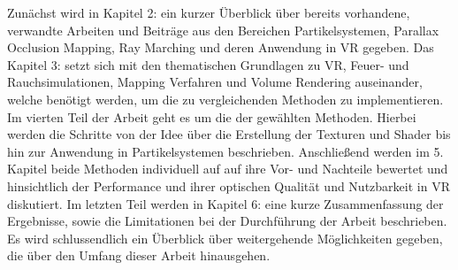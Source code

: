 Zunächst wird in Kapitel 2: \textbf{} ein kurzer Überblick über bereits vorhandene, verwandte Arbeiten
und Beiträge aus den Bereichen Partikelsystemen, Parallax Occlusion Mapping, Ray Marching und deren Anwendung in VR gegeben.
Das Kapitel 3: \textbf{} setzt sich mit den thematischen Grundlagen zu VR, Feuer- und Rauchsimulationen,
Mapping Verfahren und Volume Rendering auseinander, welche benötigt werden, um die zu vergleichenden Methoden zu implementieren.
Im vierten Teil der Arbeit geht es um die \textbf{} der gewählten Methoden. Hierbei werden die Schritte 
von der Idee über die Erstellung der Texturen und Shader bis hin zur Anwendung in Partikelsystemen beschrieben.
Anschließend werden im 5. Kapitel \textbf{} beide  Methoden individuell auf auf ihre Vor- und Nachteile bewertet und 
hinsichtlich der Performance und ihrer optischen Qualität und Nutzbarkeit in VR diskutiert. 
Im letzten Teil werden in Kapitel 6: \textbf{} eine kurze Zusammenfassung der Ergebnisse, sowie die Limitationen bei der 
Durchführung der Arbeit beschrieben. Es wird schlussendlich ein Überblick über weitergehende Möglichkeiten gegeben, die über den 
Umfang dieser Arbeit hinausgehen. 